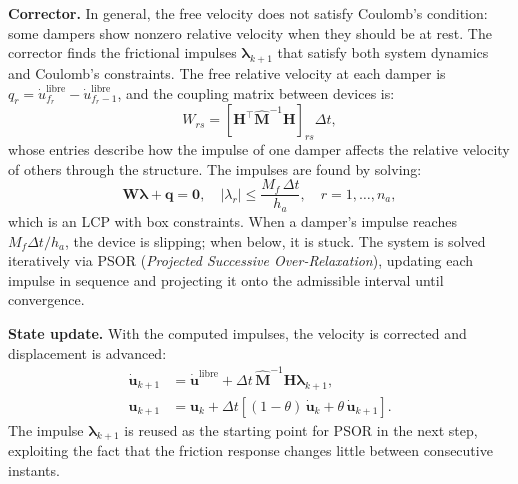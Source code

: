 \documentclass[preprint,12pt,authoryear]{elsarticle}
\newcommand{\Mf}{M_{\!f}}
\newcommand{\ha}{h_a}
\begin{document}
\textbf{Corrector.}
In general, the free velocity does not satisfy Coulomb's condition: some dampers show
nonzero relative velocity when they should be at rest. The corrector finds the
frictional impulses $\bm{\lambda}_{k+1}$ that satisfy both system dynamics and
Coulomb's constraints. The free relative velocity at each damper is
$q_r = \dot{u}^{\mathrm{libre}}_{f_r} - \dot{u}^{\mathrm{libre}}_{f_r-1}$, and the
coupling matrix between devices is:
\begin{equation}
    W_{rs} = \left[\bm{H}^{\top}\hat{\bm{M}}^{-1}\bm{H}\right]_{rs}\Delta t,
    \label{eq:W}
\end{equation}
whose entries describe how the impulse of one damper affects the relative velocity of
others through the structure. The impulses are found by solving:
\begin{equation}
    \bm{W}\bm{\lambda} + \bm{q} = \bm{0},
    \quad |\lambda_r| \leq \frac{\Mf\,\Delta t}{\ha},
    \quad r = 1,\ldots,n_a,
    \label{eq:lcp}
\end{equation}
which is an LCP with box constraints. When a damper's impulse reaches $\Mf\Delta t/\ha$,
the device is slipping; when below, it is stuck. The system is solved iteratively via
PSOR (\textit{Projected Successive Over-Relaxation}), updating each impulse in sequence
and projecting it onto the admissible interval until convergence.

\textbf{State update.}
With the computed impulses, the velocity is corrected and displacement is advanced:
\begin{align}
    \dot{\bm{u}}_{k+1} &= \dot{\bm{u}}^{\mathrm{libre}}
        + \Delta t\,\hat{\bm{M}}^{-1}\bm{H}\bm{\lambda}_{k+1}, \label{eq:vupdate}\\
    \bm{u}_{k+1} &= \bm{u}_k
        + \Delta t\!\left[(1-\theta)\,\dot{\bm{u}}_k
                         + \theta\,\dot{\bm{u}}_{k+1}\right]. \label{eq:uupdate}
\end{align}
The impulse $\bm{\lambda}_{k+1}$ is reused as the starting point for PSOR in the next
step, exploiting the fact that the friction response changes little between consecutive
instants.
\end{document}
